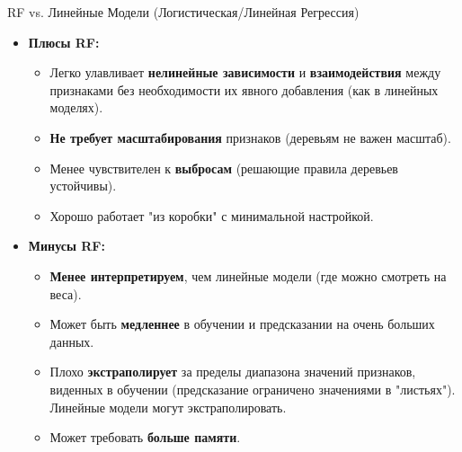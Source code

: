 \begin{myblock}{RF vs. Линейные Модели (Логистическая/Линейная Регрессия)}
    \begin{itemize}
        \item \textbf{Плюсы RF:}
            \begin{itemize}
                \item Легко улавливает \textbf{нелинейные зависимости} и \textbf{взаимодействия} между признаками без необходимости их явного добавления (как в линейных моделях).
                \item \textbf{Не требует масштабирования} признаков (деревьям не важен масштаб).
                \item Менее чувствителен к \textbf{выбросам} (решающие правила деревьев устойчивы).
                \item Хорошо работает "из коробки" с минимальной настройкой.
            \end{itemize}
        \item \textbf{Минусы RF:}
            \begin{itemize}
                \item \textbf{Менее интерпретируем}, чем линейные модели (где можно смотреть на веса).
                \item Может быть \textbf{медленнее} в обучении и предсказании на очень больших данных.
                \item Плохо \textbf{экстраполирует} за пределы диапазона значений признаков, виденных в обучении (предсказание ограничено значениями в "листьях"). Линейные модели могут экстраполировать.
                \item Может требовать \textbf{больше памяти}.
            \end{itemize}
    \end{itemize}
\end{myblock}

